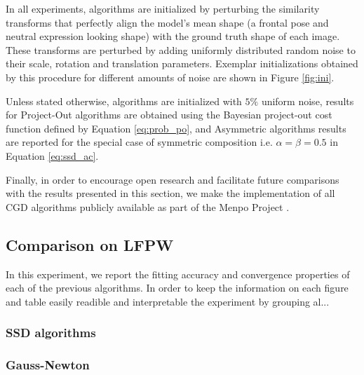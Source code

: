 In all experiments, algorithms are initialized by perturbing the similarity transforms that perfectly align the model's mean shape (a frontal pose and neutral expression looking shape) with the ground truth shape of each image. These transforms are perturbed by adding uniformly distributed random noise to their scale, rotation and translation parameters. Exemplar initializations obtained by this procedure for different amounts of noise are shown in Figure \ref{fig:ini}.

Unless stated otherwise, algorithms are initialized with $5\%$ uniform noise, results for Project-Out algorithms are obtained using the Bayesian project-out cost function defined by Equation \ref{eq:prob_po}, and Asymmetric algorithms  results are reported for the special case of symmetric composition i.e. $\alpha=\beta=0.5$ in Equation \ref{eq:ssd_ac}.

Finally, in order to encourage open research and facilitate future comparisons with the results presented in this section, we make the implementation of all CGD algorithms publicly available as part of the Menpo Project \cite{Menpo2014}.

\subsection{Comparison on LFPW}

In this experiment, we report the fitting accuracy and convergence properties of each of the previous algorithms. In order to keep the information on each figure and table easily readible and interpretable the experiment by grouping al...


\subsubsection{SSD algorithms}


\subsubsection*{Gauss-Newton}

